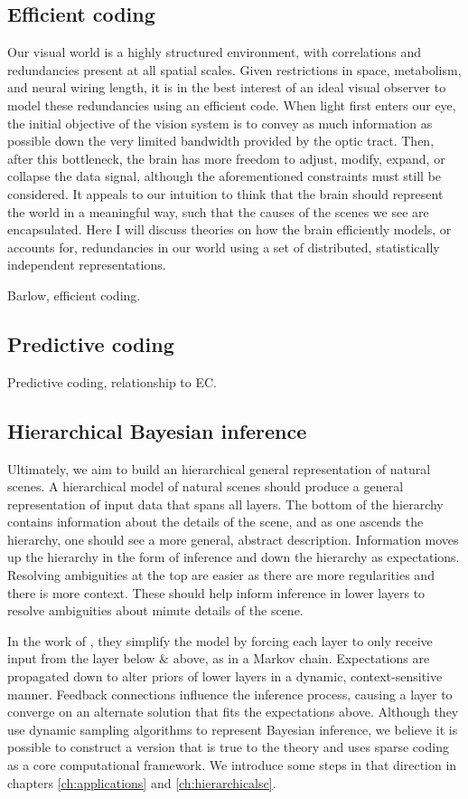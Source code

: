\subsection{Efficient coding}
Our visual world is a highly structured environment, with correlations and redundancies present at all spatial scales. Given restrictions in space, metabolism, and neural wiring length, it is in the best interest of an ideal visual observer to model these redundancies using an efficient code. When light first enters our eye, the initial objective of the vision system is to convey as much information as possible down the very limited bandwidth provided by the optic tract. Then, after this bottleneck, the brain has more freedom to adjust, modify, expand, or collapse the data signal, although the aforementioned constraints must still be considered. It appeals to our intuition to think that the brain should represent the world in a meaningful way, such that the causes of the scenes we see are encapsulated. Here I will discuss theories on how the brain efficiently models, or accounts for, redundancies in our world using a set of distributed, statistically independent representations.

Barlow, efficient coding.

\subsection{Predictive coding}
Predictive coding, relationship to EC.

\subsection{Hierarchical Bayesian inference}
Ultimately, we aim to build an hierarchical general representation of natural scenes. A hierarchical model of natural scenes should produce a general representation of input data that spans all layers. The bottom of the hierarchy contains information about the details of the scene, and as one ascends the hierarchy, one should see a more general, abstract description. Information moves up the hierarchy in the form of inference and down the hierarchy as expectations. Resolving ambiguities at the top are easier as there are more regularities and there is more context. These should help inform inference in lower layers to resolve ambiguities about minute details of the scene.

In the work of \citet{lee2003hierarchical}, they simplify the model by forcing each layer to only receive input from the layer below & above, as in a Markov chain. Expectations are propagated down to alter priors of lower layers in a dynamic, context-sensitive manner. Feedback connections influence the inference process, causing a layer to converge on an alternate solution that fits the expectations above. Although they use dynamic sampling algorithms to represent Bayesian inference, we believe it is possible to construct a version that is true to the theory and uses sparse coding as a core computational framework. We introduce some steps in that direction in chapters \ref{ch:applications} and \ref{ch:hierarchicalsc}.

